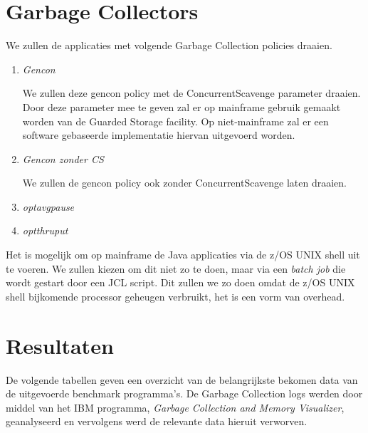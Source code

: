 \section{Garbage Collectors}
We zullen de applicaties met volgende Garbage Collection policies draaien.

\begin{enumerate}
    
    \item \textit{Gencon}
    
    We zullen deze gencon policy met de ConcurrentScavenge parameter draaien.
    Door deze parameter mee te geven zal er op mainframe gebruik gemaakt worden van de Guarded Storage facility.
    Op niet-mainframe zal er een software gebaseerde implementatie hiervan uitgevoerd worden.
    
    \item \textit{Gencon zonder CS}
    
    We zullen de gencon policy ook zonder ConcurrentScavenge laten draaien.
    
    \item \textit{optavgpause}
    
    \item \textit{optthruput}
    
    
    
\end{enumerate}


Het is mogelijk om op mainframe de Java applicaties via de z/OS UNIX shell uit te voeren.
We zullen kiezen om dit niet zo te doen, maar via een \textit{batch job} die wordt gestart door een JCL script. 
Dit zullen we zo doen omdat de z/OS UNIX shell bijkomende processor geheugen verbruikt, het is een vorm van overhead.

\section{Resultaten}

De  volgende tabellen geven een overzicht van de belangrijkste bekomen data van de uitgevoerde benchmark programma's.
De Garbage Collection logs werden door middel van het IBM programma, \textit{Garbage Collection and Memory Visualizer}, geanalyseerd en vervolgens werd de relevante data hieruit verworven.


